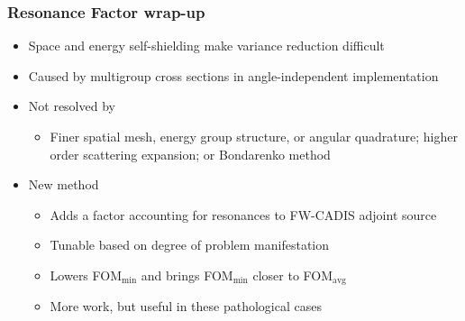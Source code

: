\documentclass[xcolor=x11names,compress]{beamer}
\renewcommand{\(}{\begin{columns}}
\renewcommand{\)}{\end{columns}}
\newcommand{\<}[1]{\begin{column}{#1}}
\renewcommand{\>}{\end{column}}
\begin{document}
\begin{frame}[fragile]
  \frametitle{Resonance Factor wrap-up}
  
  \begin{itemize}
  \item Space and energy self-shielding make variance reduction difficult
  
  \item Caused by multigroup cross sections in angle-independent implementation
  
  \item Not resolved by
   \begin{itemize}
   \item Finer spatial mesh, energy group structure, or angular quadrature; higher order scattering expansion; or Bondarenko method
   \end{itemize}
  \pause 
  \item New method
   \begin{itemize}
  	\item Adds a factor accounting for resonances to FW-CADIS adjoint source
  	\item Tunable based on degree of problem manifestation
	\item Lowers FOM$_{\min}$ and brings FOM$_{\min}$ closer to FOM$_{\text{avg}}$
	\item More work, but useful in these pathological cases
   \end{itemize}
  \end{itemize}

\end{frame}


\end{document}
